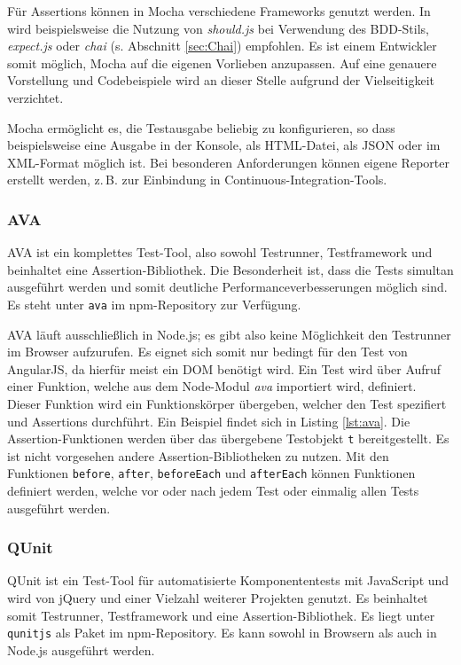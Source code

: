 Für Assertions können in Mocha verschiedene Frameworks genutzt werden. In \cite{mocha-index} wird beispielsweise die Nutzung von \textit{should.js} bei Verwendung des BDD-Stils, \textit{expect.js} oder \textit{chai} (s. Abschnitt \ref{sec:Chai}) empfohlen. Es ist einem Entwickler somit möglich, Mocha auf die eigenen Vorlieben anzupassen.\cite{mocha-index} Auf eine genauere Vorstellung und Codebeispiele wird an dieser Stelle aufgrund der Vielseitigkeit verzichtet.

Mocha ermöglicht es, die Testausgabe beliebig zu konfigurieren, so dass beispielsweise eine Ausgabe in der Konsole, als HTML-Datei, als JSON oder im XML-Format möglich ist. Bei besonderen Anforderungen können eigene Reporter erstellt werden, z.\,B. zur Einbindung in Continuous-Integration-Tools.

\subsubsection{AVA}
\label{sec:Ava}
AVA ist ein komplettes Test-Tool, also sowohl Testrunner, Testframework und beinhaltet eine Assertion-Bibliothek. Die Besonderheit ist, dass die Tests simultan ausgeführt werden und somit deutliche Performanceverbesserungen möglich sind. Es steht unter \texttt{ava} im npm-Repository zur Verfügung.\cite{ava}

AVA läuft ausschließlich in Node.js; es gibt also keine Möglichkeit den Testrunner im Browser aufzurufen. Es eignet sich somit nur bedingt für den Test von AngularJS, da hierfür meist ein DOM benötigt wird. Ein Test wird über Aufruf einer Funktion, welche aus dem Node-Modul \textit{ava} importiert wird, definiert. Dieser Funktion wird ein Funktionskörper übergeben, welcher den Test spezifiert und Assertions durchführt. Ein Beispiel findet sich in Listing \ref{lst:ava}. Die Assertion-Funktionen werden über das übergebene Testobjekt \texttt{t} bereitgestellt. Es ist nicht vorgesehen andere Assertion-Bibliotheken zu nutzen. Mit den Funktionen \texttt{before}, \texttt{after}, \texttt{beforeEach} und \texttt{afterEach} können Funktionen definiert werden, welche vor oder nach jedem Test oder einmalig allen Tests ausgeführt werden.\cite{ava}

\begin{figure}[H]
	
\end{figure}

\subsubsection{QUnit}
\label{sec:QUnit}
QUnit ist ein Test-Tool für automatisierte Komponententests mit JavaScript und wird von jQuery und einer Vielzahl weiterer Projekten genutzt. Es beinhaltet somit Testrunner, Testframework und eine Assertion-Bibliothek. Es liegt unter \texttt{qunitjs} als Paket im npm-Repository. Es kann sowohl in Browsern als auch in Node.js ausgeführt werden.\cite{qunit-index}


